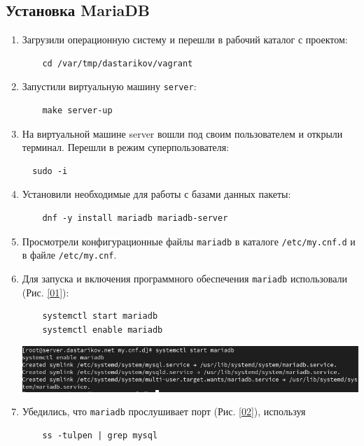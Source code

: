 \subsection{Установка MariaDB}
\begin{enumerate}
\item Загрузили операционную систему и перешли в рабочий каталог с проектом:
  \begin{verbatim}
    cd /var/tmp/dastarikov/vagrant
  \end{verbatim}

\item Запустили виртуальную машину \texttt{server}:
  \begin{verbatim}
    make server-up
  \end{verbatim}

\item На виртуальной машине server вошли под своим пользователем и открыли терминал. Перешли в режим суперпользователя:
\begin{verbatim}
  sudo -i
\end{verbatim}
\item Установили необходимые для работы с базами данных пакеты:
  \begin{verbatim}
    dnf -y install mariadb mariadb-server
  \end{verbatim}
\item Просмотрели конфигурационные файлы \texttt{mariadb} в каталоге \texttt{/etc/my.cnf.d} и в файле \texttt{/etc/my.cnf}.
\item Для запуска и включения программного обеспечения \texttt{mariadb} использовали (Рис. \ref{01}):
  \begin{verbatim}
    systemctl start mariadb
    systemctl enable mariadb
  \end{verbatim}

\begin{center}
    \centering
    \includegraphics[width=\textwidth]{../images/image01.png}
    \label{01}
\end{center}

\item Убедились, что \texttt{mariadb} прослушивает порт (Рис. \ref{02}), используя 
  \begin{verbatim}
    ss -tulpen | grep mysql
  \end{verbatim}


\end{enumerate}
